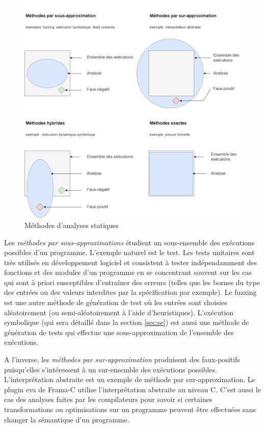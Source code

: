         \begin{figure}[!ht]
            \centering
            \includegraphics[scale=0.56]{ch1-context/img/analysis.drawio.fr.png}
            \caption{Méthodes d'analyses statiques} \label{fig:analysis-methods}           
        \end{figure}           
        
        Les \textit{méthodes par sous-approximations} étudient un sous-ensemble des exécutions possibles d'un programme. L'exemple naturel est le test. Les tests unitaires sont très utilisés en développement logiciel et consistent à tester indépendamment des fonctions et des modules d'un programme en se concentrant souvent sur les cas qui sont à priori susceptibles d'entraîner des erreurs (telles que les bornes du type des entrées ou des valeurs interdites par la spécification par exemple). 
        Le fuzzing \cite{Manes/TSE19} est une autre méthode de génération de test où les entrées sont choisies aléatoirement (ou semi-aléatoirement à l'aide d'heuristiques).
        L'exécution symbolique \cite{King/ACM76} (qui sera détaillé dans la section \ref{sec:se}) est aussi une méthode de génération de tests qui effectue une sous-approximation de l'ensemble des exécutions. 
        
        \begin{sloppypar}  
        A l'inverse, les \textit{méthodes par sur-approximation} produisent des faux-positifs puisqu'elles s'intéressent à un sur-ensemble des exécutions possibles. L'interprétation abstraite \cite{cousot1977abstract, Cousot/CSL14} est un exemple de méthode par sur-approximation. Le plugin \gls{eva} de Frama-C \cite{FramaC-EVA} utilise l'interprétation abstraite au niveau C. C'est aussi le cas des analyses faites par les compilateurs pour savoir si certaines transformations ou optimisations sur un programme peuvent être effectuées sans changer la sémantique d'un programme. 
        \end{sloppypar}   
      
